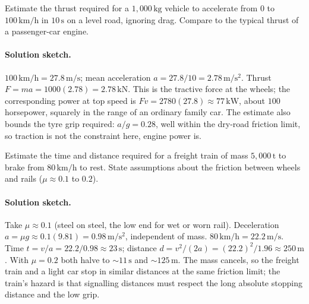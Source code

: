 \begin{exercise}
Estimate the thrust required for a $1{,}000\,\si{\kilogram}$ vehicle
to accelerate from $0$ to $100\,\si{\kilo\meter\per\hour}$ in
$10\,\si{\second}$ on a level road, ignoring drag. Compare to the
typical thrust of a passenger-car engine.
\paragraph{Solution sketch.} $100\,\si{\kilo\meter\per\hour}=27.8\,
\si{\meter\per\second}$; mean acceleration $a=27.8/10=2.78\,\si{
\meter\per\second\squared}$. Thrust $F=ma=1000(2.78)=2.78\,\si{\kilo
\newton}$. This is the tractive force at the wheels; the corresponding
power at top speed is $Fv=2780(27.8)\approx 77\,\si{\kilo\watt}$,
about $100$ horsepower, squarely in the range of an ordinary family
car. The estimate also bounds the tyre grip required: $a/g=0.28$, well
within the dry-road friction limit, so traction is not the
constraint here, engine power is.
\end{exercise}

\begin{exercise}
Estimate the time and distance required for a freight train of mass
$5{,}000\,\si{\tonne}$ to brake from $80\,\si{\kilo\meter\per\hour}$
to rest. State assumptions about the friction between wheels and
rails ($\mu \approx 0.1$ to $0.2$).
\paragraph{Solution sketch.} Take $\mu\approx 0.1$ (steel on steel,
the low end for wet or worn rail). Deceleration $a=\mu g\approx
0.1(9.81)=0.98\,\si{\meter\per\second\squared}$, independent of mass.
$80\,\si{\kilo\meter\per\hour}=22.2\,\si{\meter\per\second}$. Time
$t=v/a=22.2/0.98\approx 23\,\si{\second}$; distance $d=v^{2}/(2a)=
(22.2)^{2}/1.96\approx 250\,\si{\meter}$. With $\mu=0.2$ both halve to
$\sim 11\,\si{\second}$ and $\sim 125\,\si{\meter}$. The mass cancels,
so the freight train and a light car stop in similar distances at the
same friction limit; the train's hazard is that signalling distances
must respect the long absolute stopping distance and the low grip.
\end{exercise}

